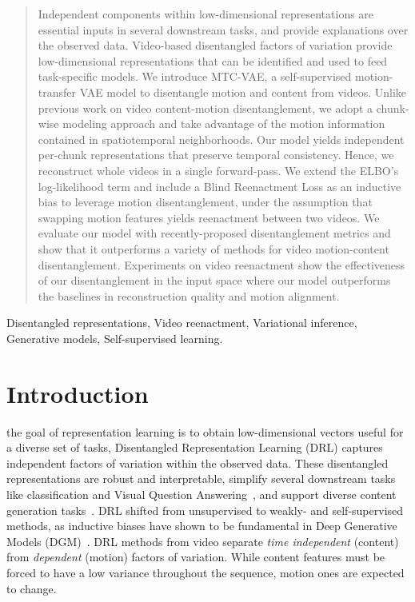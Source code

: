 \documentclass[journal]{IEEEtran}
\begin{document}
\begin{abstract}
Independent components within low-dimensional representations are essential inputs in several downstream tasks, and provide explanations over the observed data.
Video-based disentangled factors of variation provide low-dimensional representations that can be identified and used to feed task-specific models.
We introduce MTC-VAE, a self-supervised motion-transfer VAE model to disentangle motion and content from videos.
Unlike previous work on video content-motion disentanglement, we adopt a chunk-wise modeling approach and take advantage of the motion information contained in spatiotemporal neighborhoods.
Our model yields independent per-chunk representations that preserve temporal consistency.
Hence, we reconstruct whole videos in a single forward-pass.
We extend the ELBO's log-likelihood term and include a Blind Reenactment Loss as an inductive bias to leverage motion disentanglement, under the assumption that swapping motion features yields reenactment between two videos.
We evaluate our model with recently-proposed disentanglement metrics and show that it outperforms a variety of methods for video motion-content disentanglement.
Experiments on video reenactment show the effectiveness of our disentanglement in the input space where our model outperforms the baselines in reconstruction quality and motion alignment.
\end{abstract}

\begin{IEEEkeywords}
Disentangled representations, Video reenactment, Variational inference, Generative models, Self-supervised learning.
\end{IEEEkeywords}

\IEEEpeerreviewmaketitle

\section{Introduction}
\label{sec:introduction}

 the goal of representation learning is to obtain low-dimensional vectors useful for a diverse set of tasks, Disentangled Representation Learning (DRL) captures independent factors of variation within the observed data.
These disentangled representations are robust and interpretable, simplify several downstream tasks like classification and Visual Question Answering~\cite{Locatello2020aaai}, and support diverse content generation tasks~\cite{Chen2020tip,Ramesh2021}.
DRL shifted from unsupervised to weakly- and self-supervised methods, as inductive biases have shown to be fundamental in Deep Generative Models (DGM)~\cite{Locatello2019, Shu2020}.
DRL methods from video separate \emph{time independent} (\aka content) from \emph{dependent} (\aka motion) factors of variation.
While content features must be forced to have a low variance throughout the sequence, motion ones are expected to change.
\end{document}
